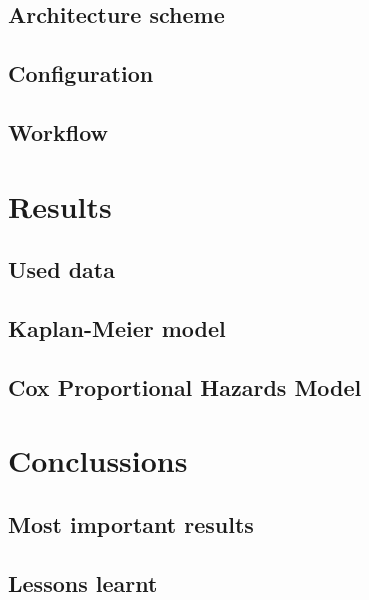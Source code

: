 \documentclass[11pt]{article} %
\begin{document}
\subsection{Architecture scheme}

\subsection{Configuration}

\subsection{Workflow}

\section{Results}

\subsection{Used data}

\subsection{Kaplan-Meier model}

\subsection{Cox Proportional Hazards Model}

\section{Conclussions}

\subsection{Most important results}

\subsection{Lessons learnt}
\end{document}
